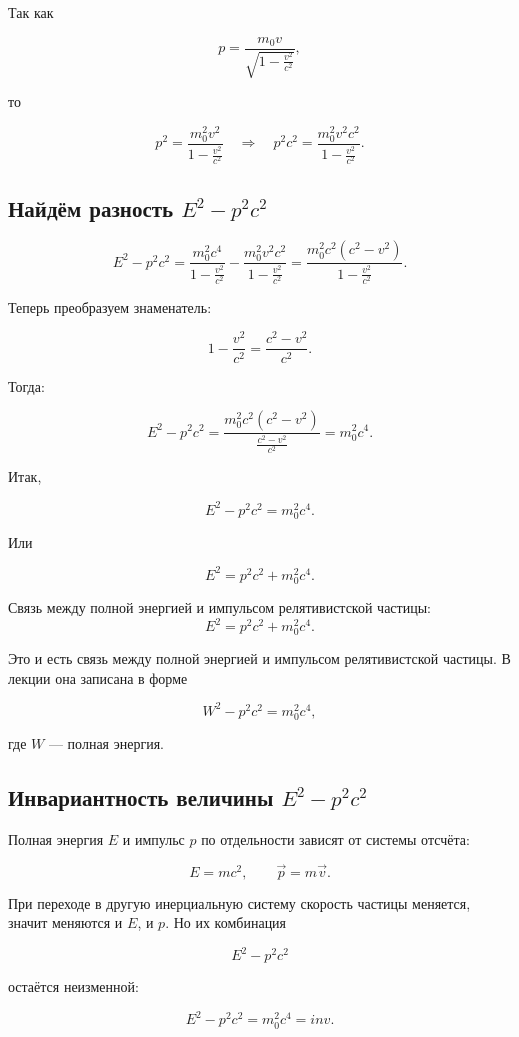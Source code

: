 \documentclass[a4paper,12pt]{article}
\begin{document}
Так как

\[
p
=
\frac{m_0v}{\sqrt{1-\frac{v^2}{c^2}}},
\]

то

\[
p^2
=
\frac{m_0^2v^2}{1-\frac{v^2}{c^2}}
\quad \Rightarrow \quad
p^2c^2
=
\frac{m_0^2v^2c^2}{1-\frac{v^2}{c^2}}.
\]

\subsection*{Найдём разность $E^2-p^2c^2$}

\[
E^2-p^2c^2
=
\frac{m_0^2c^4}{1-\frac{v^2}{c^2}}
-
\frac{m_0^2v^2c^2}{1-\frac{v^2}{c^2}}
=
\frac{m_0^2c^2(c^2-v^2)}{1-\frac{v^2}{c^2}}.
\]

Теперь преобразуем знаменатель:

\[
1-\frac{v^2}{c^2}
=
\frac{c^2-v^2}{c^2}.
\]

Тогда:

\[
E^2-p^2c^2
=
\frac{m_0^2c^2(c^2-v^2)}
{\frac{c^2-v^2}{c^2}}
=
m_0^2c^4.
\]

Итак,

\[
E^2-p^2c^2
=
m_0^2c^4.
\]

Или

\[
E^2
=
p^2c^2
+
m_0^2c^4.
\]

\begin{theorembox}
Связь между полной энергией и импульсом релятивистской частицы:
\[
E^2
=
p^2c^2
+
m_0^2c^4.
\]
\end{theorembox}

Это и есть связь между полной энергией и импульсом релятивистской частицы. В лекции она записана в форме

\[
W^2-p^2c^2=m_0^2c^4,
\]

где $W$ — полная энергия.

\subsection*{Инвариантность величины $E^2-p^2c^2$}

Полная энергия $E$ и импульс $p$ по отдельности зависят от системы отсчёта:

\[
E=mc^2,
\qquad
\vec p=m\vec v.
\]

При переходе в другую инерциальную систему скорость частицы меняется, значит меняются и $E$, и $p$. Но их комбинация

\[
E^2-p^2c^2
\]

остаётся неизменной:

\[
E^2-p^2c^2
=
m_0^2c^4
=
inv.
\]
\end{document}
